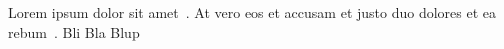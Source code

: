 \documentclass[]{article}
\begin{document}
    Lorem ipsum dolor sit amet~\citep{Silberschatz2005}.
    At vero eos et accusam et justo duo dolores et ea rebum~\citet{Silberschatz2005}.
    Bli Bla Blup \cite{Silberschatz2005}

    \clearpage
    \printbibliography
\end{document}
